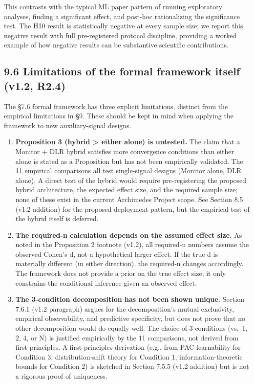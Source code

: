 \documentclass[11pt]{article}
\begin{document}
This contrasts with the typical ML paper pattern of running exploratory
analyses, finding a significant effect, and post-hoc rationalizing the
significance test. The H10 result is statistically negative at every
sample size; we report this negative result with full pre-registered
protocol discipline, providing a worked example of how negative results
can be substantive scientific contributions.

\subsection{9.6 Limitations of the formal framework itself (v1.2,
R2.4)}\label{limitations-of-the-formal-framework-itself-v1.2-r2.4}

The §7.6 formal framework has three explicit limitations, distinct from
the empirical limitations in §9. These should be kept in mind when
applying the framework to new auxiliary-signal designs.

\begin{enumerate}
\def\labelenumi{\arabic{enumi}.}
\item
  \textbf{Proposition 3 (hybrid \textgreater{} either alone) is
  untested.} The claim that a Monitor + DLR hybrid satisfies more
  convergence conditions than either alone is stated as a Proposition
  but has not been empirically validated. The 11 empirical comparisons
  all test single-signal designs (Monitor alone, DLR alone). A direct
  test of the hybrid would require pre-registering the proposed hybrid
  architecture, the expected effect size, and the required sample size;
  none of these exist in the current Archimedes Project scope. See
  Section 8.5 (v1.2 addition) for the proposed deployment pattern, but
  the empirical test of the hybrid itself is deferred.
\item
  \textbf{The required-n calculation depends on the assumed effect
  size.} As noted in the Proposition 2 footnote (v1.2), all required-n
  numbers assume the observed Cohen's d, not a hypothetical larger
  effect. If the true d is materially different (in either direction),
  the required-n changes accordingly. The framework does not provide a
  prior on the true effect size; it only constrains the conditional
  inference given an observed effect.
\item
  \textbf{The 3-condition decomposition has not been shown unique.}
  Section 7.6.1 (v1.2 paragraph) argues for the decomposition's mutual
  exclusivity, empirical observability, and predictive specificity, but
  does not prove that no other decomposition would do equally well. The
  choice of 3 conditions (vs.~1, 2, 4, or N) is justified empirically by
  the 11 comparisons, not derived from first principles. A
  first-principles derivation (e.g., from PAC-learnability for Condition
  3, distribution-shift theory for Condition 1, information-theoretic
  bounds for Condition 2) is sketched in Section 7.5.5 (v1.2 addition)
  but is not a rigorous proof of uniqueness.
\end{enumerate}
\end{document}
